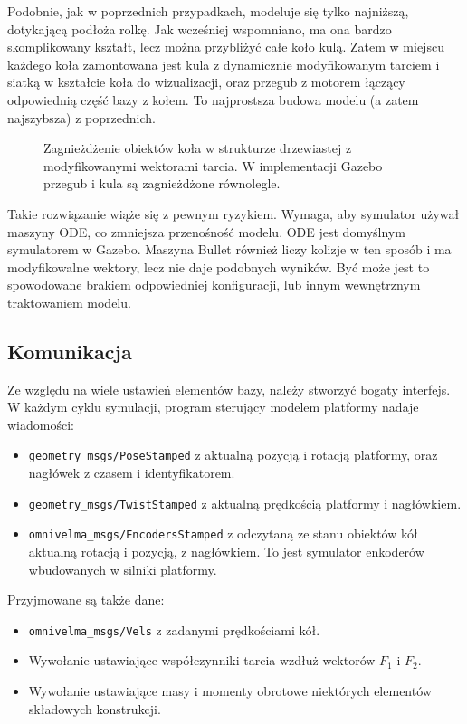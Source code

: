 		Podobnie, jak w poprzednich przypadkach, modeluje się tylko najniższą, dotykającą podłoża rolkę.
		Jak wcześniej wspomniano, ma ona bardzo skomplikowany kształt, lecz można przybliżyć całe koło kulą.
		Zatem w miejscu każdego koła zamontowana jest kula z dynamicznie modyfikowanym tarciem i siatką w kształcie koła do wizualizacji, 
		oraz przegub z motorem łączący odpowiednią część bazy z kołem.
		To najprostsza budowa modelu (a zatem najszybsza) z poprzednich.
		
		\begin{figure}[H]
		\caption{Zagnieżdżenie obiektów koła w strukturze drzewiastej z modyfikowanymi wektorami tarcia. W implementacji Gazebo przegub i kula są zagnieżdżone równolegle.}
		\label{fig:omnivelma_wheel}
		\end{figure}

		Takie rozwiązanie wiąże się z pewnym ryzykiem.
		Wymaga, aby symulator używał maszyny ODE, co zmniejsza przenośność modelu. ODE jest domyślnym symulatorem w Gazebo.
		Maszyna Bullet również liczy kolizje w ten sposób i ma modyfikowalne wektory, 
		lecz nie daje podobnych wyników. Być może jest to spowodowane brakiem odpowiedniej konfiguracji, lub innym wewnętrznym traktowaniem modelu.

	\subsection{Komunikacja}
		Ze względu na wiele ustawień elementów bazy, należy stworzyć bogaty interfejs.
		W każdym cyklu symulacji, program sterujący modelem platformy nadaje wiadomości:
		\begin{itemize}
		\item \texttt{geometry\_msgs/PoseStamped} z aktualną pozycją i rotacją platformy, oraz nagłówek z czasem i identyfikatorem.
		\item \texttt{geometry\_msgs/TwistStamped} z aktualną prędkością platformy i nagłówkiem.
		\item \texttt{omnivelma\_msgs/EncodersStamped} z odczytaną ze stanu obiektów kół aktualną rotacją i pozycją, z nagłówkiem. 
		To jest symulator enkoderów wbudowanych w silniki platformy.
		\end{itemize}
		
		Przyjmowane są także dane:
		\begin{itemize}
		\item \texttt{omnivelma\_msgs/Vels} z zadanymi prędkościami kół.
		\item Wywołanie ustawiające współczynniki tarcia wzdłuż wektorów $F_1$ i $F_2$.
		\item Wywołanie ustawiające masy i momenty obrotowe niektórych elementów składowych konstrukcji.
		\end{itemize}

